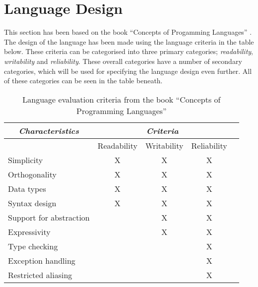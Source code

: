 \chapter{Language Design}

This section has been based on the book ``Concepts of Progamming Languages'' \cite{CoPL}. The design of the language has been made using the language criteria in the table below. These criteria can be categorised into three primary categories; \textit{readability}, \textit{writability} and \textit{reliability}. These overall categories have a number of secondary categories, which will be used for specifying the language design even further. All of these categories can be seen in the table beneath.

\begin{table}[htbp]
\centering
\begin{tabular}{|l|c|c|c|c|}
\hline
\multicolumn{1}{|c|}{\textit{Characteristics}} & \multicolumn{3}{|c|}{\textit{Criteria}} \\ \hline
 & Readability & Writability & Reliability \\ \hline
Simplicity & X & X & X \\ \hline
Orthogonality & X & X & X \\ \hline
Data types & X & X & X \\ \hline
Syntax design & X & X & X  \\ \hline
Support for abstraction & & X & X  \\ \hline
Expressivity & & X & X \\ \hline
Type checking & & & X \\ \hline
Exception handling & & & X \\ \hline
Restricted aliasing & & & X \\ \hline
\end{tabular}
\caption{Language evaluation criteria from the book ``Concepts of Programming Languages''\cite{CoPL}}
\label{tbl:evaluation criteria}
\end{table}

